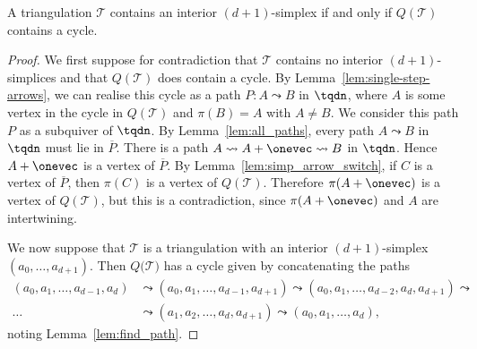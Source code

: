 \begin{prop}\label{prop:no-cyc}
A triangulation $\mathcal{T}$ contains an interior $(d+1)$-simplex if and only if $Q(\mathcal{T})$ contains a cycle.
\end{prop}
\begin{proof}
We first suppose for contradiction that $\mathcal{T}$ contains no interior $(d+1)$-simplices and that $Q(\mathcal{T})$ does contain a cycle. By Lemma~\ref{lem:single-step-arrows}, we can realise this cycle as a path $P \colon A \leadsto B$ in $\tqdn$, where $A$ is some vertex in the cycle in $Q(\mathcal{T})$ and $\pi(B) = A$ with $A \neq B$. We consider this path $P$ as a subquiver of $\tqdn$. By Lemma~\ref{lem:all_paths}, every path $A \leadsto B$ in $\tqdn$ must lie in $\overline{P}$. There is a path $A \leadsto A + \onevec \leadsto B$ in $\tqdn$. Hence $A + \onevec$ is a vertex of $\overline{P}$. By Lemma~\ref{lem:simp_arrow_switch}, if $C$ is a vertex of $\overline{P}$, then $\pi(C)$ is a vertex of $Q(\mathcal{T})$. Therefore $\pi(A + \onevec)$ is a vertex of $Q(\mathcal{T})$, but this is a contradiction, since $\pi(A + \onevec)$ and $A$ are intertwining.

We now suppose that $\mathcal{T}$ is a triangulation with an interior $(d + 1)$-simplex  $(a_{0}, \dots, a_{d + 1})$. Then $Q(\mathcal{T)}$ has a cycle given by concatenating the paths
\begin{align*}
(a_{0}, a_{1}, \dots, a_{d - 1}, a_{d}) &\leadsto (a_{0}, a_{1}, \dots , a_{d - 1}, a_{d + 1}) \leadsto (a_{0}, a_{1}, \dots, a_{d - 2}, a_{d}, a_{d + 1}) \leadsto \\
 \dots &\leadsto (a_{1}, a_{2}, \dots, a_{d}, a_{d + 1}) \leadsto (a_{0}, a_{1}, \dots , a_{d}),
\end{align*}
noting Lemma~\ref{lem:find_path}.
\end{proof}

